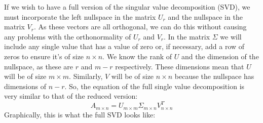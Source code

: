 \documentclass[600paper, 11pt,twoside,openany]{kdp}
\begin{document}
If we wish to have a full version of the singular value decomposition (SVD), we must incorporate the left nullspace in the matrix $U_r$ and the nullspace in the matrix $V_r$. As these vectors are all orthogonal, we can do this without causing any problems with the orthonormality of $U_r$ and $V_r$. In the matrix $\Sigma$ we will include any single value that has a value of zero or, if necessary, add a row of zeros to ensure it’s of size $n \times n$. We know the rank of $U$ and the dimension of the nullspace, as these are $r$ and $m−r$ respectively. These dimensions mean that $U$ will be of size $m \times m$. Similarly, $V$ will be of size $n \times n$ because the nullspace has dimensions of $n−r$. So, the equation of the full single value decomposition is very similar to that of the reduced version:
\begin{equation}
A_{m \times n} = U_{m \times m} \Sigma_{m \times n} V^T_{n \times n} 
\end{equation}
\newpage
\indent Graphically, this is what the full SVD looks like:
\end{document}
